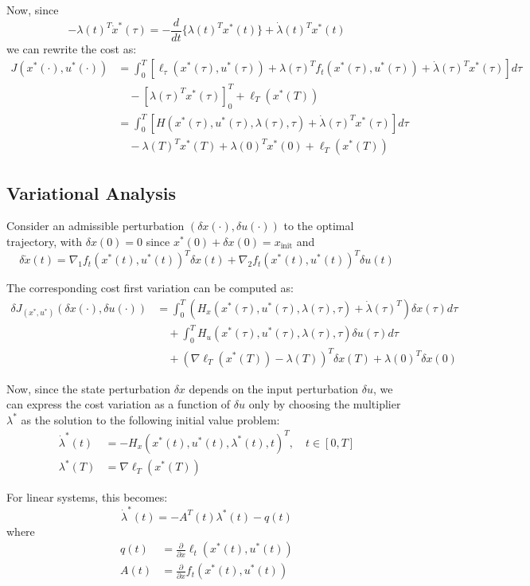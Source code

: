 \documentclass[openany]{book}
\theoremstyle{definition}
\theoremstyle{remark}
\begin{document}
Now, since
\[
    -\lambda(t)^T\dot{x}^*(\tau) = -\frac{d}{dt}\{\lambda(t)^Tx^*(t)\} + \dot{\lambda}(t)^Tx^*(t)
\]
we can rewrite the cost as:
\begin{align*}
    J(x^*(\cdot),u^*(\cdot)) &= \int_0^T[\ell_\tau(x^*(\tau),u^*(\tau)) + \lambda(\tau)^Tf_t(x^*(\tau),u^*(\tau)) + \dot{\lambda}(\tau)^Tx^*(\tau)]d\tau\\
    &\quad -[\lambda(\tau)^Tx^*(\tau)]_0^T + \ell_T(x^*(T))\\
    &= \int_0^T[H(x^*(\tau),u^*(\tau),\lambda(\tau),\tau) + \dot{\lambda}(\tau)^Tx^*(\tau)]d\tau\\
    &\quad -\lambda(T)^Tx^*(T) + \lambda(0)^Tx^*(0) + \ell_T(x^*(T))
\end{align*}

\subsection{Variational Analysis}
Consider an admissible perturbation $(\delta x(\cdot),\delta u(\cdot))$ to the optimal trajectory, with $\delta x(0)=0$ since $x^*(0) + \delta x(0) = x_{\text{init}}$ and
\[
    \delta \dot{x}(t) = \nabla_1f_t(x^*(t),u^*(t))^T\delta x(t) + \nabla_2f_t(x^*(t),u^*(t))^T\delta u(t)
\]

The corresponding cost first variation can be computed as:
\begin{align*}
    \delta J_{(x^*,u^*)}(\delta x(\cdot),\delta u(\cdot)) &= \int_0^T(H_x(x^*(\tau),u^*(\tau),\lambda(\tau),\tau) + \dot{\lambda}(\tau)^T)\delta x(\tau)d\tau\\
    &\quad + \int_0^T H_u(x^*(\tau),u^*(\tau),\lambda(\tau),\tau)\delta u(\tau)d\tau\\
    &\quad + (\nabla\ell_T(x^*(T)) - \lambda(T))^T\delta x(T) + \lambda(0)^T\delta x(0)
\end{align*}

Now, since the state perturbation $\delta x$ depends on the input perturbation $\delta u$, we can express the cost variation as a function of $\delta u$ only by choosing the multiplier $\lambda^*$ as the solution to the following initial value problem:
\begin{align*}
    \dot{\lambda}^*(t) &= -H_x(x^*(t),u^*(t),\lambda^*(t),t)^T, \quad t \in [0,T]\\
    \lambda^*(T) &= \nabla\ell_T(x^*(T))
\end{align*}

For linear systems, this becomes:
\[
    \dot{\lambda}^*(t) = -A^T(t)\lambda^*(t) - q(t)
\]
where
\begin{align*}
    q(t) &= \frac{\partial}{\partial x}\ell_t(x^*(t),u^*(t))\\
    A(t) &= \frac{\partial}{\partial x}f_t(x^*(t),u^*(t))
\end{align*}
\end{document}
